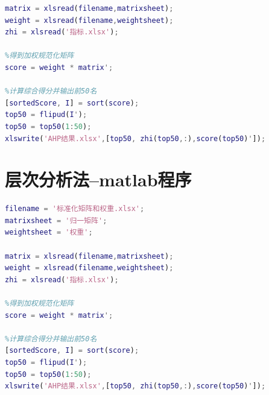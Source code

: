 \documentclass{cumcmthesis}
\begin{document}
\begin{appendices}
\begin{lstlisting}[language=matlab]
matrix = xlsread(filename,matrixsheet);
weight = xlsread(filename,weightsheet);
zhi = xlsread('指标.xlsx');

%得到加权规范化矩阵
score = weight * matrix';

%计算综合得分并输出前50名
[sortedScore, I] = sort(score);
top50 = flipud(I');
top50 = top50(1:50);
xlswrite('AHP结果.xlsx',[top50, zhi(top50,:),score(top50)']);
\end{lstlisting}
    \section{层次分析法--matlab程序}
    \begin{lstlisting}[language=matlab]
%读入数据
filename = '标准化矩阵和权重.xlsx';
matrixsheet = '归一矩阵';
weightsheet = '权重';

matrix = xlsread(filename,matrixsheet);
weight = xlsread(filename,weightsheet);
zhi = xlsread('指标.xlsx');

%得到加权规范化矩阵
score = weight * matrix';

%计算综合得分并输出前50名
[sortedScore, I] = sort(score);
top50 = flipud(I');
top50 = top50(1:50);
xlswrite('AHP结果.xlsx',[top50, zhi(top50,:),score(top50)']);
\end{lstlisting}
\end{appendices}
\end{document}
